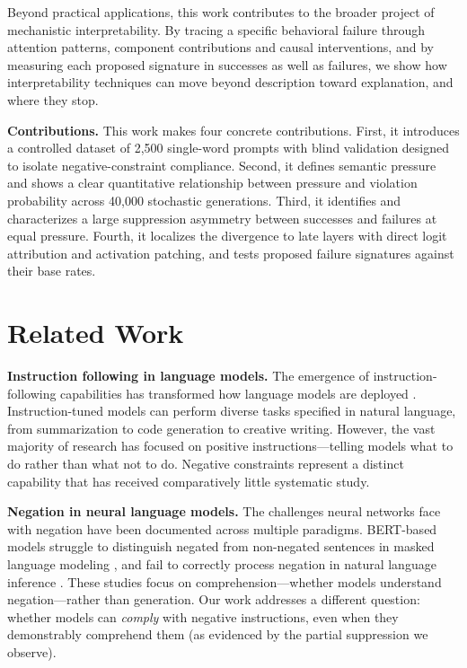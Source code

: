 \documentclass{article}
\begin{document}
Beyond practical applications, this work contributes to the broader project of mechanistic interpretability. By tracing a specific behavioral failure through attention patterns, component contributions and causal interventions, and by measuring each proposed signature in successes as well as failures, we show how interpretability techniques can move beyond description toward explanation, and where they stop.

\textbf{Contributions.} This work makes four concrete contributions. First, it introduces a controlled dataset of 2,500 single-word prompts with blind validation designed to isolate negative-constraint compliance. Second, it defines semantic pressure and shows a clear quantitative relationship between pressure and violation probability across 40,000 stochastic generations. Third, it identifies and characterizes a large suppression asymmetry between successes and failures at equal pressure. Fourth, it localizes the divergence to late layers with direct logit attribution and activation patching, and tests proposed failure signatures against their base rates.

\section{Related Work}

\textbf{Instruction following in language models.} The emergence of instruction-following capabilities has transformed how language models are deployed \citep{ouyang2022training, wei2022finetuned}. Instruction-tuned models can perform diverse tasks specified in natural language, from summarization to code generation to creative writing. However, the vast majority of research has focused on positive instructions---telling models what to do rather than what not to do. Negative constraints represent a distinct capability that has received comparatively little systematic study.

\textbf{Negation in neural language models.} The challenges neural networks face with negation have been documented across multiple paradigms. BERT-based models struggle to distinguish negated from non-negated sentences in masked language modeling \citep{kassner2020negated}, and fail to correctly process negation in natural language inference \citep{hossain2022analysis}. These studies focus on comprehension---whether models understand negation---rather than generation. Our work addresses a different question: whether models can \emph{comply} with negative instructions, even when they demonstrably comprehend them (as evidenced by the partial suppression we observe).
\end{document}
